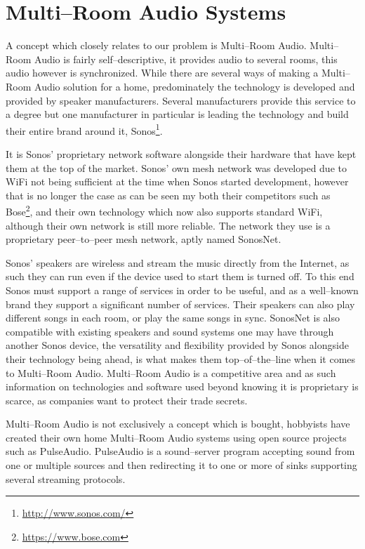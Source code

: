 \section{Multi--Room Audio Systems}
A concept which closely relates to our problem is Multi--Room Audio.
Multi--Room Audio is fairly self--descriptive, it provides audio to several rooms, this audio however is synchronized.
While there are several ways of making a Multi--Room Audio solution for a home, predominately the technology is developed and provided by speaker manufacturers.
Several manufacturers provide this service to a degree but one
manufacturer in particular is leading the technology and build their entire brand around it, Sonos\footnote{\url{http://www.sonos.com/}}.

It is Sonos' proprietary network software alongside their hardware that have kept them at the top of the market.
Sonos' own mesh network was developed due to WiFi not being sufficient
at the time when Sonos started development, however that is no longer the case as can be seen my both their competitors such as Bose\footnote{\url{https://www.bose.com}}, and their own technology which now also supports standard WiFi, although their own network is still more reliable.\cite{sonos1}
The network they use is a proprietary peer--to--peer mesh network, aptly named SonosNet.\cite{sonosWiki}

Sonos' speakers are wireless and stream the music directly from the Internet, as such they can run even if the device used to start them is turned off.
To this end Sonos must support a range of services in order to be useful, and as a well--known brand they support a significant number of services.
Their speakers can also play different songs in each room, or play the same songs in sync.
SonosNet is also compatible with existing speakers and sound systems one may have through another Sonos device, the versatility and flexibility provided by Sonos alongside their technology being ahead, is what makes them top--of--the--line when it comes to Multi--Room Audio.\cite{sonos2}
Multi--Room Audio is a competitive area and as such information on technologies and software used beyond knowing it is proprietary is scarce, as companies want to protect their trade secrets.

Multi--Room Audio is not exclusively a concept which is bought, hobbyists have created their own home Multi--Room Audio systems using open source projects such as PulseAudio.\cite{pulseAudioHobbyist}
PulseAudio is a sound--server program accepting sound from one or multiple sources and then redirecting it to one or more of sinks supporting several streaming protocols.\cite{pulseAudioModules}

